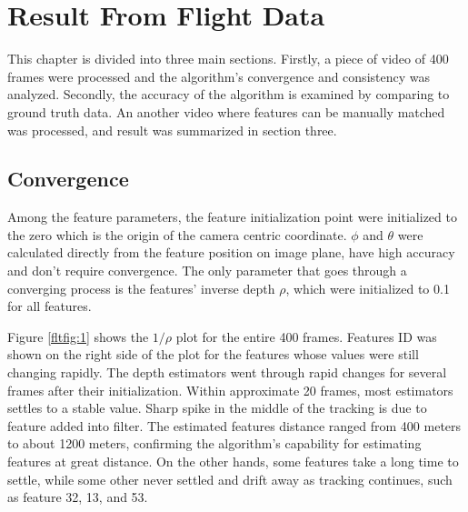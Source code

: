 \chapter{Result From Flight Data}\label{ch:FlightResult}

This chapter is divided into three main sections. Firstly, a piece of
video of 400 frames were processed and the algorithm's convergence and
consistency was analyzed. Secondly, the accuracy of the algorithm is
examined by comparing to ground truth data. An another video where
features can be manually matched was processed, and result was
summarized in section three.

\section{Convergence}
Among the feature parameters, the feature initialization point were
initialized to the zero which is the origin of the camera centric
coordinate. $\phi$ and $\theta$ were calculated directly from the
feature position on image plane, have high accuracy and don't require
convergence. The only parameter that goes through a converging process
is the features' inverse depth $\rho$, which were initialized to 0.1
for all features. 

Figure \ref{fltfig:1} shows the $1/\rho$ plot for the entire 400
frames. Features ID was shown on the right side of the plot for the
features whose values were still changing rapidly. The depth
estimators went through rapid changes for several frames after their
initialization. Within approximate 20 frames, most estimators settles
to a stable value. Sharp spike in the middle of the tracking is due to
feature added into filter. The estimated features distance ranged from
400 meters to about 1200 meters, confirming the algorithm's capability
for estimating features at great distance. On the other hands, some
features take a long time to settle, while some other never settled
and drift away as tracking continues, such as feature 32, 13, and 53.

